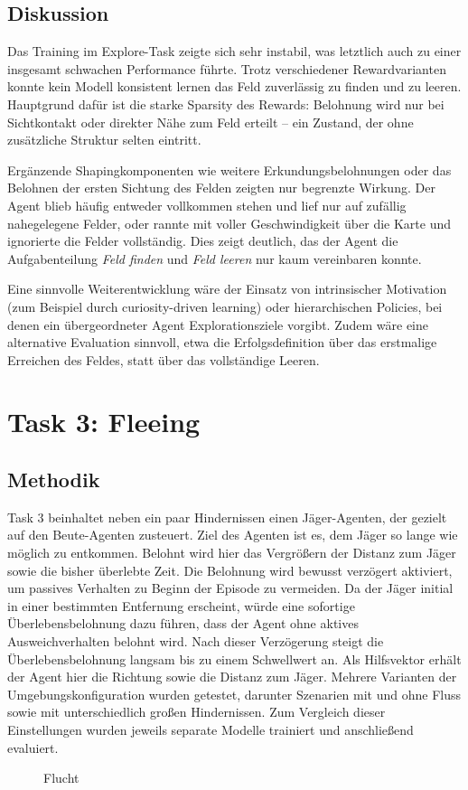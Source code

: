 \subsection{Diskussion}
Das Training im Explore-Task zeigte sich sehr instabil, was letztlich auch zu einer insgesamt schwachen Performance führte. Trotz verschiedener Rewardvarianten konnte kein Modell konsistent lernen das Feld zuverlässig zu finden und zu leeren. Hauptgrund dafür ist die starke Sparsity des Rewards: Belohnung wird nur bei Sichtkontakt oder direkter Nähe zum Feld erteilt – ein Zustand, der ohne zusätzliche Struktur selten eintritt.

Ergänzende Shapingkomponenten wie weitere Erkundungsbelohnungen oder das Belohnen der ersten Sichtung des Felden zeigten nur begrenzte Wirkung. Der Agent blieb häufig entweder vollkommen stehen und lief nur auf zufällig nahegelegene Felder, oder rannte mit voller Geschwindigkeit über die Karte und ignorierte die Felder vollständig. Dies zeigt deutlich, das der Agent die Aufgabenteilung \emph{Feld finden} und \emph{Feld leeren} nur kaum vereinbaren konnte.

Eine sinnvolle Weiterentwicklung wäre der Einsatz von intrinsischer Motivation (zum Beispiel durch curiosity-driven learning) oder hierarchischen Policies, bei denen ein übergeordneter Agent Explorationsziele vorgibt. Zudem wäre eine alternative Evaluation sinnvoll, etwa die Erfolgsdefinition über das erstmalige Erreichen des Feldes, statt über das vollständige Leeren.

\section{Task 3: Fleeing}
\label{sec:flee}
\subsection{Methodik}
Task 3 beinhaltet neben ein paar Hindernissen einen Jäger-Agenten, der gezielt auf den Beute-Agenten zusteuert. Ziel des Agenten ist es, dem Jäger so lange wie möglich zu entkommen. Belohnt wird hier das Vergrößern der Distanz zum Jäger sowie die bisher überlebte Zeit. Die Belohnung wird bewusst verzögert aktiviert, um passives Verhalten zu Beginn der Episode zu vermeiden. Da der Jäger initial in einer bestimmten Entfernung erscheint, würde eine sofortige Überlebensbelohnung dazu führen, dass der Agent ohne aktives Ausweichverhalten belohnt wird. Nach dieser Verzögerung steigt die Überlebensbelohnung langsam bis zu einem Schwellwert an. Als Hilfsvektor erhält der Agent hier die Richtung sowie die Distanz zum Jäger. Mehrere Varianten der Umgebungskonfiguration wurden getestet, darunter Szenarien mit und ohne Fluss sowie mit unterschiedlich großen Hindernissen. Zum Vergleich dieser Einstellungen wurden jeweils separate Modelle trainiert und anschließend evaluiert.
\begin{figure}[htbp]
  \centering
  \caption{Flucht}
  \label{fig:flee_scenario}
\end{figure}
